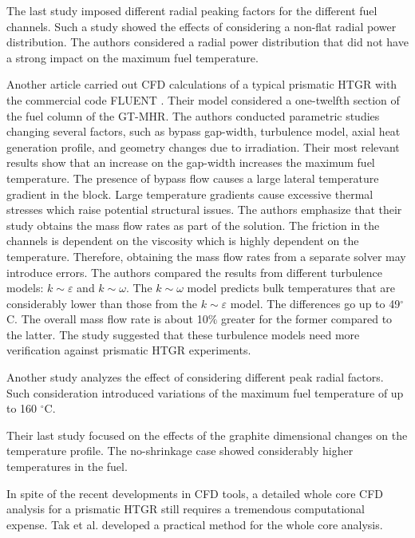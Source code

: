 \documentclass[11pt,letterpaper]{article}
\begin{document}
The last study imposed different radial peaking factors for the different fuel channels.
Such a study showed the effects of considering a non-flat radial power distribution.
The authors considered a radial power distribution that did not have a strong impact on the maximum fuel temperature.

Another article \cite{sato_computational_2010} carried out \gls{CFD} calculations of a typical prismatic \gls{HTGR} with the commercial code FLUENT \cite{fluent_inc_fluent_2006}.
Their model considered a one-twelfth section of the fuel column of the GT-MHR.
The authors conducted parametric studies changing several factors, such as bypass gap-width, turbulence model, axial heat generation profile, and geometry changes due to irradiation.
Their most relevant results show that an increase on the gap-width increases the maximum fuel temperature.
The presence of bypass flow causes a large lateral temperature gradient in the block.
Large temperature gradients cause excessive thermal stresses which raise potential structural issues.
The authors emphasize that their study obtains the mass flow rates as part of the solution.
The friction in the channels is dependent on the viscosity which is highly dependent on the temperature.
Therefore, obtaining the mass flow rates from a separate solver may introduce errors.
The authors compared the results from different turbulence models: $k \sim \varepsilon$ and $k \sim \omega$.
The $k \sim \omega$ model predicts bulk temperatures that are considerably lower than those from the $k \sim \varepsilon$ model.
The differences go up to 49$^{\circ}$C.
The overall mass flow rate is about 10$\%$ greater for the former compared to the latter.
The study suggested that these turbulence models need more verification against prismatic HTGR experiments.

Another study analyzes the effect of considering different peak radial factors. Such consideration introduced variations of the maximum fuel temperature of up to 160 $^{\circ}$C.

Their last study focused on the effects of the graphite dimensional changes on the temperature profile.
The no-shrinkage case showed considerably higher temperatures in the fuel.


In spite of the recent developments in CFD tools, a detailed whole core CFD analysis for a prismatic \gls{HTGR} still requires a tremendous computational expense.
Tak et al. \cite{tak_practical_2012} developed a practical method for the whole core analysis.
\end{document}

